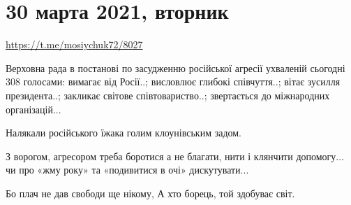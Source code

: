  
 
 
 
 
\section{30 марта 2021, вторник}
\label{sec:30_03_2021}

\url{https://t.me/mosiychuk72/8027}

Верховна рада в постанові по засудженню російської агресії ухваленій сьогодні
308 голосами: вимагає від Росії..; висловлює глибокі співчуття..; вітає зусилля
президента..; закликає світове співтовариство..; звертається до міжнародних
організацій...

Налякали російського їжака голим клоунівським задом.

З ворогом, агресором треба боротися а не благати, нити і клянчити допомогу...
чи про «жму року» та «подивитися в очі» дискутувати...

Бо плач не дав свободи ще нікому, А хто борець, той здобуває світ.
